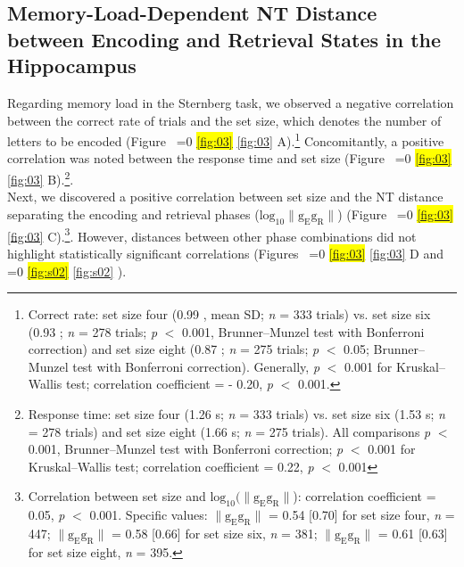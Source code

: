\documentclass[preprint,review,12pt]{elsarticle}%
\newcommand{\hl}[1]{\colorbox{yellow}{#1}}
\newcommand{\hlref}[1]{%
  \ifnum\getrefnumber{#1}=0
    \hl{\ref*{#1}}%
  \else
    \ref{#1}%
  \fi
}
\begin{document}
\subsection{Memory-Load-Dependent NT Distance between Encoding and Retrieval States in the Hippocampus}
Regarding memory load in the Sternberg task, we observed a negative correlation between the correct rate of trials and the set size, which denotes the number of letters to be encoded (Figure~\hlref{fig:03}A).\footnote{Correct rate: set size four (0.99 , mean \textpm SD; \textit{n} = 333 trials) vs. set size six (0.93 ; \textit{n} = 278 trials; \textit{p} $<$ 0.001, Brunner--Munzel test with Bonferroni correction) and set size eight (0.87 ; \textit{n} = 275 trials; \textit{p} $<$ 0.05; Brunner--Munzel test with Bonferroni correction). Generally, \textit{p} $<$ 0.001 for Kruskal--Wallis test; correlation coefficient = - 0.20, \textit{p} $<$ 0.001.} Concomitantly, a positive correlation was noted between the response time and set size (Figure~\hlref{fig:03}B).\footnote{Response time: set size four (1.26  s; \textit{n} = 333 trials) vs. set size six (1.53  s; \textit{n} = 278 trials) and set size eight (1.66  s; \textit{n} = 275 trials). All comparisons \textit{p} $<$ 0.001, Brunner--Munzel test with Bonferroni correction; \textit{p} $<$ 0.001 for Kruskal--Wallis test; correlation coefficient = 0.22, \textit{p} $<$ 0.001}.
\\
\indent
Next, we discovered a positive correlation between set size and the NT distance separating the encoding and retrieval phases ($\mathrm{log_{10}\lVert g_{E}g_{R} \rVert}$) (Figure~\hlref{fig:03}C).\footnote{Correlation between set size and $\mathrm{log_{10}(\lVert g_{E}g_{R} \rVert}$): correlation coefficient = 0.05, \textit{p} $<$ 0.001. Specific values: $\mathrm{\lVert g_{E}g_{R} \rVert}$ = 0.54 [0.70] for set size four, \textit{n} = 447; $\mathrm{\lVert g_{E}g_{R} \rVert}$ = 0.58 [0.66] for set size six, \textit{n} = 381; $\mathrm{\lVert g_{E}g_{R} \rVert}$ = 0.61 [0.63] for set size eight, \textit{n} = 395.}. However, distances between other phase combinations did not highlight statistically significant correlations (Figures~\hlref{fig:03}D and \hlref{fig:s02}).
\end{document}
